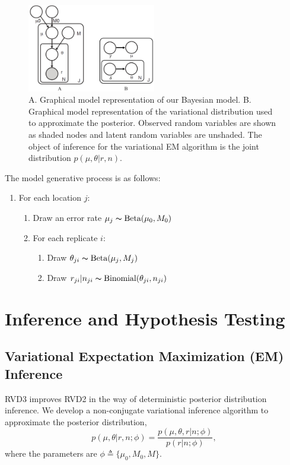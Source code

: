 \documentclass[11pt,reqno]{amsart}
\begin{document}
\begin{figure}[htpb]
\centering
\includegraphics[width=0.5\textwidth]{figs/rvd3_model.png}
\caption{A. Graphical model representation of our Bayesian model.
B. Graphical model representation of the variational distribution used to approximate the posterior.
Observed random variables are shown as shaded nodes and latent random variables are unshaded.
The object of inference for the variational EM algorithm is the joint distribution $p(\mu, \theta|r, n)$.}
\label{tbl:graphical_model}
\end{figure}
The model generative process is as follows:
\begin{enumerate}[noitemsep]
	\item For each location $j$:
	\begin{enumerate}
		\item Draw an error rate $\mu_j \thicksim \text{Beta}(\mu_0, M_0)$
		\item For each replicate $i$:
		\begin{enumerate}
			\item Draw $\theta_{ji} \thicksim \text{Beta}(\mu_j, M_j)$
			\item Draw $r_{ji} | n_{ji} \thicksim \text{Binomial}(\theta_{ji}, n_{ji})$
		\end{enumerate}
	\end{enumerate}
\end{enumerate}


\section{Inference and Hypothesis Testing}
\subsection{Variational Expectation Maximization (EM) Inference}
RVD3 improves RVD2 in the way of deterministic posterior distribution inference.
We develop a non-conjugate variational inference algorithm to approximate the posterior distribution,
\begin{equation}
	p(\mu, \theta | r, n; \phi)  = \frac{ p(\mu, \theta, r | n; \phi) } {p ( r | n; \phi)},
\end{equation}
where the parameters are $\phi \triangleq \{\mu_0, M_0, M\}$.
\end{document}

